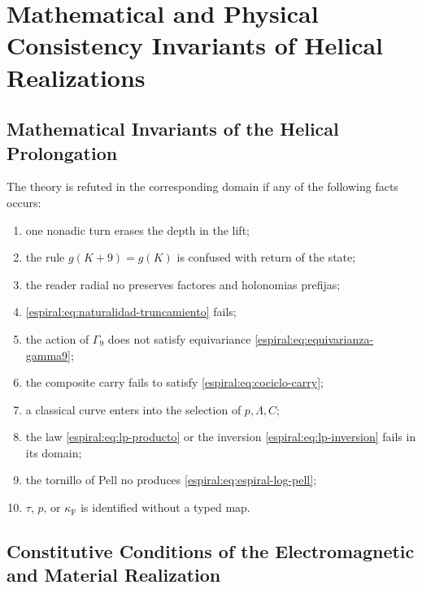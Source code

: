 \chapter{Mathematical and Physical Consistency Invariants of Helical Realizations}

\section{Mathematical Invariants of the Helical Prolongation}

The theory is refuted in the corresponding domain if any of the following
facts occurs:
\begin{enumerate}
\item one nonadic turn erases the depth in the lift;
\item the rule \(g(K+9)=g(K)\) is confused with return of the state;
\item the reader radial no preserves factores and holonomias prefijas;
\item \cref{espiral:eq:naturalidad-truncamiento} fails;
\item the action of \(\Gamma_9\) does not satisfy equivariance
\cref{espiral:eq:equivarianza-gamma9};
\item the composite carry fails to satisfy \cref{espiral:eq:cociclo-carry};
\item a classical curve enters into the selection of \(p,\Lambda,C\);
\item the law \cref{espiral:eq:lp-producto} or the inversion
\cref{espiral:eq:lp-inversion} fails in its domain;
\item the tornillo of Pell no produces \cref{espiral:eq:espiral-log-pell};
\item \(\tau\), \(p\), or \(\kappa_{\mathrm{F}}\) is identified without a typed
map.
\end{enumerate}

\section{Constitutive Conditions of the Electromagnetic and Material Realization}

